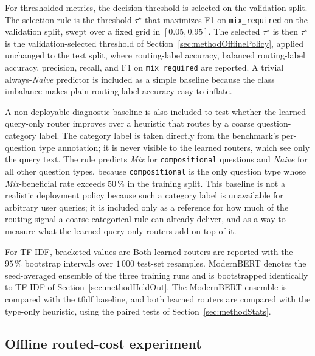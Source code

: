 \documentclass[english, bibtex]{kththesis}               %
\numberwithin{listing}{chapter}
\providecommand{\DIFaddtex}[1]{{\protect\color{blue} \sf #1}} %
\providecommand{\DIFdeltex}[1]{{\protect\color{red} \scriptsize #1}} %
\providecommand{\DIFaddbegin}{} %
\providecommand{\DIFaddend}{} %
\providecommand{\DIFdelbegin}{} %
\providecommand{\DIFdelend}{} %
\providecommand{\DIFadd}[1]{\texorpdfstring{\DIFaddtex{#1}}{#1}} %
\providecommand{\DIFdel}[1]{\texorpdfstring{\DIFdeltex{#1}}{}} %
\begin{document}
For thresholded metrics, the decision threshold \DIFdelbegin \DIFdel{is selected on the validation split. The selection rule is the threshold $\tau^\star$ that maximizes F1 on \texttt{mix\_required} on the validation split, swept over a fixed grid in $[0.05, 0.95]$. The selected $\tau^\star$ is then }\DIFdelend \DIFaddbegin \DIFadd{$\tau^\star$ is the validation-selected threshold of Section~\ref{sec:methodOfflinePolicy}, }\DIFaddend applied unchanged to the test split, where routing-label accuracy, balanced routing-label accuracy, precision, recall, and F1 on \texttt{mix\_required} are reported. A trivial always-\emph{Naive} predictor is included as a simple baseline because the class imbalance makes plain routing-label accuracy easy to inflate.

A non-deployable diagnostic baseline is also included to test whether the learned query-only router improves over a heuristic that routes by a coarse question-category label. The category label is taken directly from the benchmark's per-question type annotation; it is never visible to the learned routers, which see only the query text. The rule predicts \emph{Mix} for \texttt{compositional} questions and \emph{Naive} for all other question types, because \texttt{compositional} is the only question type whose \emph{Mix}-beneficial rate exceeds $50\,\%$ in the training split. This baseline is not a realistic deployment policy because such a category label is unavailable for arbitrary user queries; it is included only as a reference for how much of the routing signal a coarse categorical rule can already deliver, and as a way to measure what the learned query-only routers add on top of it.

\DIFdelbegin \DIFdel{For TF-IDF, bracketed values are }\DIFdelend \DIFaddbegin \DIFadd{Both learned routers are reported with the }\DIFaddend $95\,\%$ bootstrap intervals \DIFdelbegin \DIFdel{\cite{efron1979bootstrap} over $1\,000$ test-set resamples. ModernBERT denotes the seed-averaged ensemble of the three training runs and is bootstrapped identically to TF-IDF}\DIFdelend \DIFaddbegin \DIFadd{of Section~\ref{sec:methodHeldOut}. The ModernBERT ensemble is compared with the \gls{tfidf} baseline, and both learned routers are compared with the type-only heuristic, using the paired tests of Section~\ref{sec:methodStats}}\DIFaddend .

\DIFdelbegin %
\DIFdelend \DIFaddbegin \subsection{Offline routed-cost experiment}
\DIFaddend \label{sec:implPolicy}
\end{document}
